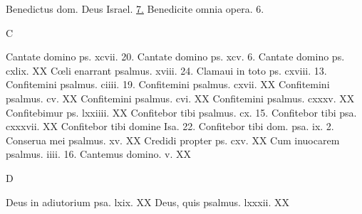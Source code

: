 \documentclass[a5paper,10pt]{book}
\def\oe{œ}
\begin{document}
\begin{multicols}{2}
\newline Benedictus dom. Deus Israel. \hfill \hyperlink{Benedictus}{7.}
\newline Benedicite omnia opera. \hfill 6.
\newline \vspace{-1.75em}
\begin{center}
\color{red} C
\end{center}
\vspace{-.75em}
\par \noindent Cantate domino ps. xcvii. \hfill 20.
\newline Cantate domino ps. xcv. \hfill 6.
\newline Cantate domino ps. cxlix. \hfill XX
\newline C\oe li enarrant psalmus. xviii. \hfill 24.
\newline Clamaui in toto ps. cxviii. \hfill 13.
\newline Confitemini psalmus. ciiii. \hfill 19.
\newline Confitemini psalmus. cxvii. \hfill XX
\newline Confitemini psalmus. cv. \hfill XX
\newline Confitemini psalmus. cvi. \hfill XX
\newline Confitemini psalmus. cxxxv. \hfill XX
\newline Confitebimur ps. lxxiiii. \hfill XX
\newline Confitebor tibi psalmus. cx. \hfill 15.
\newline Confitebor tibi psa. cxxxvii. \hfill XX
\newline Confitebor tibi domine Isa. \hfill 22.
\newline Confitebor tibi dom. psa. ix. \hfill 2.
\newline Conserua mei psalmus. xv. \hfill XX
\newline Credidi propter ps. cxv. \hfill XX
\newline Cum inuocarem psalmus. iiii. \hfill 16.
\newline Cantemus domino. v. \hfill XX
\newline \vspace{-1.75em}
\begin{center}
\color{red} D
\end{center}
\vspace{-.75em}
\par \noindent Deus in adiutorium psa. lxix. \hfill XX
\newline Deus, quis psalmus. lxxxii. \hfill XX

\end{multicols}
\end{document}
